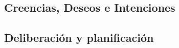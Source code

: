 \subsection{Creencias, Deseos e Intenciones}
 \label{sec:creencia_deseos_intenciones}
 
 
 
 
 

\subsection{Deliberación y planificación}
 \label{sec:deliberacion_planificacion}
 
 

